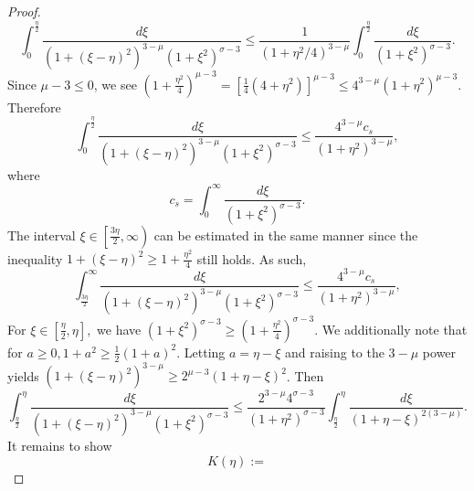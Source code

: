 \documentclass[reqno]{amsart}
\theoremstyle{plain}
\numberwithin{equation}{section}
\begin{document}
\begin{proof}
\begin{equation*}
    \int_0^{\frac{\eta}{2}}\frac{d \xi}{(1+(\xi - \eta)^2)^{3-\mu}(1 + \xi^2)^{\sigma-3}} 
        \leq \frac{1}{(1+\eta^2/4)^{3-\mu}}\int_0^{\frac{\eta}{2}}\frac{d \xi}{(1 + \xi^2)^{\sigma-3}}.
\end{equation*}
Since $\mu - 3 \leq 0$, we see 
    $(1 + \frac{\eta^2}{4})^{\mu-3} = \left[\frac14( 4 + \eta^2)\right]^{\mu-3} \leq 4^{3-\mu}(1 + \eta^2)^{\mu-3}$.
Therefore 
\begin{equation}
    \int_0^{\frac{\eta}{2}}\frac{d \xi}{(1+(\xi - \eta)^2)^{3-\mu}(1 + \xi^2)^{\sigma-3}} 
        \leq \frac{4^{3-\mu}c_s}{(1+\eta^2)^{3-\mu}},
\end{equation}
where 
    \[c_s = \int_0^{\infty}\frac{d \xi}{(1 + \xi^2)^{\sigma-3}}.\]
The interval $\xi \in \left[\frac{3\eta}{2}, \infty
\right)$ can be estimated in the same manner since the inequality $1 + (\xi - \eta)^2 \geq 1 + \frac{\eta^2}{4}$ still holds. 
As such, 
\begin{equation}
    \int_{\frac{3\eta}{2}}^{\infty}\frac{d \xi}{(1+(\xi - \eta)^2)^{3-\mu}(1 + \xi^2)^{\sigma-3}} 
        \leq \frac{4^{3-\mu}c_s}{(1+\eta^2)^{3-\mu}},
\end{equation}
For $\xi \in \left[\frac\eta2,\eta\right],$ we have $(1 + \xi^2)^{\sigma - 3} \geq (1 + \frac{\eta^2}{4})^{\sigma-3}$. 
We additionally note that for $a \geq 0, 1 + a^2 \geq \frac12(1+a)^2.$
Letting $a = \eta - \xi$ and raising to the $3 - \mu$ power yields
    $(1 + (\xi - \eta)^2)^{3-\mu} \geq 2^{\mu - 3}(1 + \eta - \xi)^{2}$. 
Then 
\begin{equation}\label{J3}
    \int_{\frac{\eta}{2}}^{\eta}\frac{d \xi}{(1+(\xi - \eta)^2)^{3-\mu}(1 + \xi^2)^{\sigma-3}} 
        \leq \frac{2^{3-\mu}4^{\sigma-3}}{(1+\eta^2)^{\sigma-3}}\int_{\frac{\eta}{2}}^{\eta}\frac{d\xi}{(1+\eta-\xi)^{2(3-\mu)}}.
\end{equation}
It remains to show 
\begin{equation*}
    K(\eta) := 

\end{equation*}
\end{proof}
\end{document}
